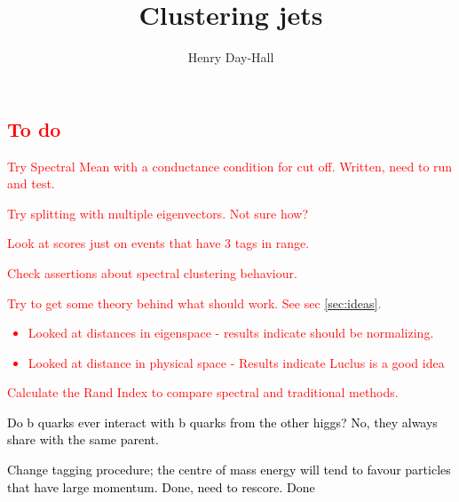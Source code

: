 \documentclass{article}
\begin{document}
	\title{Clustering jets}
	\author{Henry Day-Hall}
	
	\maketitle
	
    
	\tableofcontents
    \FloatBarrier
    \textcolor{red}{
        \section{To do}
        \begin{itemize}
            \item Try Spectral Mean with a conductance condition for cut off. Written, need to run and test.
            \item Try splitting with multiple eigenvectors.  Not sure how?
            \item Look at scores just on events that have 3 tags in range.  %
            \item Check assertions about spectral clustering behaviour.   %
            \item Try to get some theory behind what should work. See sec \ref{sec:ideas}.  %
                \begin{itemize}
                    \item Looked at distances in eigenspace - results indicate should be normalizing.
                    \item Looked at distance in physical space - Results indicate Luclus is a good idea
                \end{itemize}
            \item Calculate the Rand Index to compare spectral and traditional methods.
            \textcolor{black}{\item Do b quarks ever interact with b quarks from the other higgs? No, they always share with the same parent.}
            \textcolor{black}{\item Change tagging procedure; the centre of mass energy will tend
            to favour particles that have large momentum. Done, need to rescore. Done}
        \end{itemize}
    }
    \FloatBarrier
	
    \FloatBarrier
    
    \FloatBarrier
	
    \FloatBarrier
    
    \FloatBarrier
    
    \printbibliography	
\end{document}
